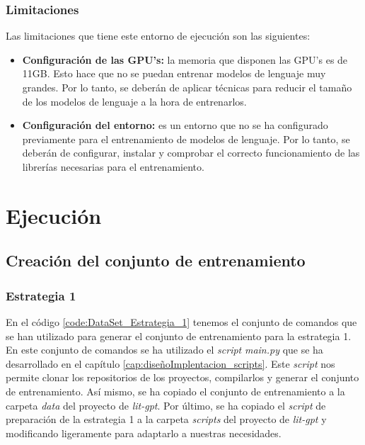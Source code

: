 \subsubsection{Limitaciones}
\label{subsubsec:limitaciones}


Las limitaciones que tiene este entorno de ejecución son las siguientes:

\begin{itemize}
    \item \textbf{Configuración de las GPU's:} la memoria que disponen las GPU's es de 11GB.
        Esto hace que no se puedan entrenar modelos de lenguaje muy grandes. Por lo tanto,
        se deberán de aplicar técnicas para reducir el tamaño de los modelos de lenguaje a la
        hora de entrenarlos.
    \item \textbf{Configuración del entorno:} es un entorno que no se ha configurado previamente
        para el entrenamiento de modelos de lenguaje. Por lo tanto, se deberán de configurar, instalar
        y comprobar el correcto funcionamiento de las librerías necesarias para el entrenamiento.
\end{itemize}

\section{Ejecución}
\label{sec:ejecucion}

\subsection{Creación del conjunto de entrenamiento}
\label{subsec:creacion_conjunto_entrenamiento}

\subsubsection{Estrategia 1}
\label{subsubsec:creacion_conjunto:estrategia_1}


En el código \ref{code:DataSet_Estrategia_1} tenemos el conjunto de comandos que se han
utilizado para generar el conjunto de entrenamiento para la estrategia 1. En este conjunto
de comandos se ha utilizado el \textit{script} \textit{main.py} que se ha desarrollado en el capítulo
\ref{cap:diseñoImplentacion_scripts}. Este \textit{script} nos permite clonar los repositorios de
los proyectos, compilarlos y generar el conjunto de entrenamiento. Así mismo, se ha copiado
el conjunto de entrenamiento a la carpeta \textit{data} del proyecto de \textit{lit-gpt}.
Por último, se ha copiado el \textit{script} de preparación de la estrategia 1 a la carpeta \textit{scripts}
del proyecto de \textit{lit-gpt} y modificando ligeramente para adaptarlo a nuestras necesidades.

